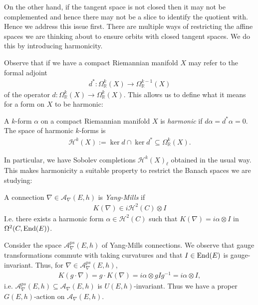 \documentclass[12pt]{ociamthesis}  %
\begin{document}
On the other hand, if the tangent space is not closed then it may not be complemented and
hence there may not be a slice to identify the quotient with. Hence we address this issue first.
There are multiple ways of restricting the affine spaces we are thinking about to
ensure orbits with closed tangent spaces. We do this by introducing harmonicity.

Observe that if we have a compact Riemannian manifold $X$ may refer to the
formal adjoint
\begin{align*}
  d^* : \Omega^k_{\mathbb{R}}(X)\to \Omega^{k-1}_{\mathbb{R}}(X)
\end{align*}
of the operator $d : \Omega^k_{\mathbb{R}}(X)\to\Omega^k_{\mathbb{R}}(X)$. This allows us to
define what it means for a form on $X$ to be harmonic:

\begin{definition}
  A $k$-form $\alpha$ on a compact Riemannian manifold $X$ is \emph{harmonic} if
  $d \alpha = d^* \alpha = 0$. The space of harmonic $k$-forms is
  \begin{align*}
    \mathcal H^k(X) := \ker d \cap \ker d^* \subseteq \Omega^k_{\mathbb{R}}(X).
  \end{align*}
\end{definition}

In particular, we have Sobolev completions $\mathcal H^k(X)_\ell$
obtained in the usual way. This makes harmonicity a suitable property to
restrict the Banach spaces we are studying:

\begin{definition}
  A connection $\nabla\in \mathcal A_\nabla(E,h)$ is \emph{Yang-Mills} if
  \begin{align}\label{eq:yang_mills_condition}
    K(\nabla) \in i\mathcal H^2(C)\otimes I
  \end{align}
  I.e. there exists a harmonic form $\alpha\in\mathcal H^2(C)$ such
  that $K(\nabla) = i\alpha\otimes I$ in $\Omega^2(C,\operatorname{End}(E))$.
\end{definition}

Consider the space $\mathcal A_\nabla^{ps}(E,h)$ of Yang-Mills connections.
We observe that gauge transformations commute with taking curvatures and
that $I\in\operatorname{End}(E)$ is gauge-invariant. Thus, for $\nabla\in \mathcal A_\nabla^{ps}(E,h)$,
\begin{align*}
  K(g\cdot\nabla)
  = g\cdot K(\nabla)
  = i\alpha\otimes gIg^{-1}
  = i\alpha\otimes I,
\end{align*}
i.e. $\mathcal A_\nabla^{ps}(E,h)\subseteq \mathcal A_\nabla(E,h)$ is $U(E,h)$-invariant.
Thus we have a proper $G(E,h)$-action on $\mathcal A_\nabla(E,h)$.
\end{document}
